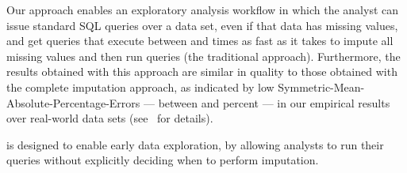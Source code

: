 

Our approach enables an exploratory analysis workflow in which the analyst can issue standard SQL queries over a data set, even if that data has missing values, and get
queries that execute between \lowxalphazero{} and \highxalphaoneexacs{} times as fast as it takes to impute all missing values and then run queries (the traditional approach). Furthermore, the results obtained with this approach
are similar in quality to those obtained with the complete imputation approach, as indicated by low Symmetric-Mean-Absolute-Percentage-Errors --- between \lowsmapealphazero{} and \highsmapealphaoneexacs{} percent --- in our empirical results
over real-world data sets (see~ for details).

\ProjectName{} is designed to enable early data exploration, by allowing analysts to run their queries without explicitly deciding when to perform imputation.

